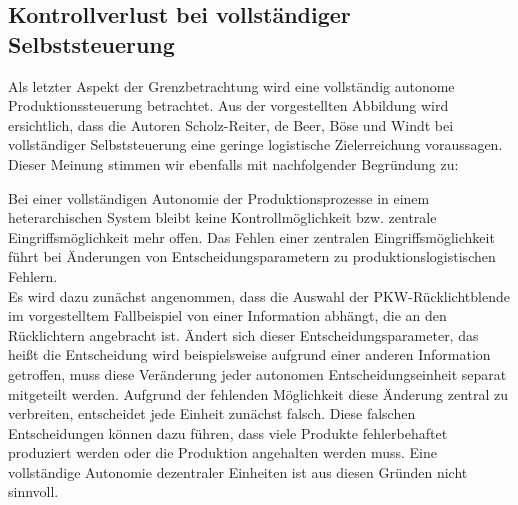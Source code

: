 \subsection{Kontrollverlust bei vollständiger Selbststeuerung}
\label{sec:GrenzenKontrollverlust}

Als letzter Aspekt der Grenzbetrachtung wird eine vollständig autonome
Produktionssteuerung betrachtet. Aus der vorgestellten Abbildung wird
ersichtlich, dass die Autoren Scholz-Reiter, de Beer, Böse und Windt bei
vollständiger Selbststeuerung eine geringe logistische Zielerreichung
voraussagen. Dieser Meinung stimmen wir ebenfalls mit nachfolgender Begründung
zu:

Bei einer vollständigen Autonomie der Produktionsprozesse in einem
heterarchischen System bleibt keine Kontrollmöglichkeit bzw. zentrale
Eingriffsmöglichkeit mehr offen. Das Fehlen einer zentralen
Eingriffsmöglichkeit führt bei Änderungen von Entscheidungsparametern zu
produktionslogistischen Fehlern. \hfill \\
Es wird dazu zunächst angenommen, dass die Auswahl der PKW-Rücklichtblende im
vorgestelltem Fallbeispiel von einer Information abhängt, die an den
Rücklichtern angebracht ist. Ändert sich dieser Entscheidungsparameter, das
heißt die Entscheidung wird beispielsweise aufgrund einer anderen Information
getroffen, muss diese Veränderung jeder autonomen Entscheidungseinheit separat
mitgeteilt werden. Aufgrund der fehlenden Möglichkeit diese Änderung zentral zu
verbreiten, entscheidet jede Einheit zunächst falsch. Diese falschen
Entscheidungen können dazu führen, dass viele Produkte fehlerbehaftet
produziert werden oder die Produktion angehalten werden muss. Eine vollständige
Autonomie dezentraler Einheiten ist aus diesen Gründen nicht sinnvoll.

\clearpage